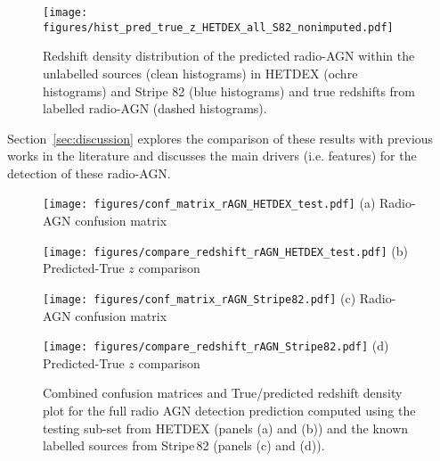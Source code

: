 \documentclass{aa}
\begin{document}
\begin{figure}
  \centering
    \texttt{[image: figures/hist\_pred\_true\_z\_HETDEX\_all\_S82\_nonimputed.pdf]}
  \caption{Redshift density distribution of the predicted radio-AGN within the unlabelled sources (clean histograms) in HETDEX (ochre histograms) and Stripe 82 (blue histograms) and true redshifts from labelled radio-AGN (dashed histograms).}
  \label{fig:hist_pred_z_unlabel_true_z_label}
\end{figure}

Section~\ref{sec:discussion} explores the comparison of these results with previous works in the literature and discusses the main drivers (i.e. features) for the detection of these radio-AGN.

\begin{figure*}
  \centering
  \begin{minipage}{0.20\textwidth}
    \centering
    \texttt{[image: figures/conf\_matrix\_rAGN\_HETDEX\_test.pdf]}\hfill\break
    {(a) Radio-AGN confusion matrix}
  \end{minipage}%
      \centering
  \begin{minipage}{0.30\textwidth}
    \centering
    \texttt{[image: figures/compare\_redshift\_rAGN\_HETDEX\_test.pdf]}\hfill\break
    {(b) Predicted-True $z$ comparison}
  \end{minipage}%
  \begin{minipage}{0.20\textwidth}
    \centering
    \texttt{[image: figures/conf\_matrix\_rAGN\_Stripe82.pdf]}\hfill\break
    {(c) Radio-AGN confusion matrix}
  \end{minipage}%
  \begin{minipage}{0.30\textwidth}
    \centering
    \texttt{[image: figures/compare\_redshift\_rAGN\_Stripe82.pdf]}\hfill\break
    {(d) Predicted-True $z$ comparison}
  \end{minipage}%
  \caption{Combined confusion matrices and True/predicted redshift density plot for the full radio AGN detection prediction computed using the testing sub-set from HETDEX (panels (a) and (b)) and the known labelled sources from Stripe\,82 (panels (c) and (d)).
  }
  \label{fig:conf_matx_results_radio_AGN}
\end{figure*}
\end{document}
